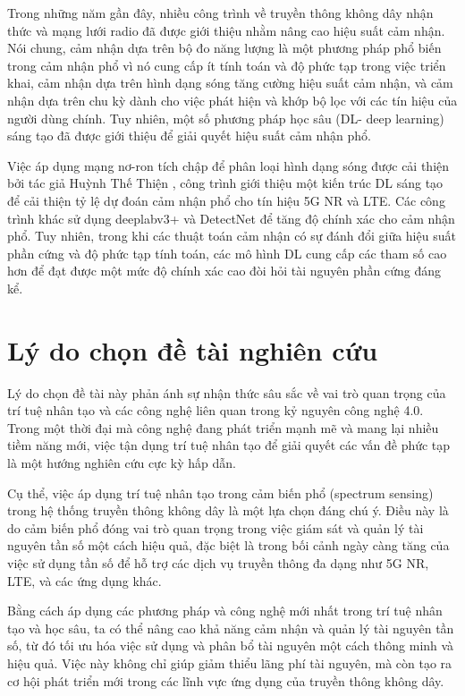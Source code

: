 Trong những năm gần đây, nhiều công trình về truyền thông không dây nhận thức và mạng lưới radio đã được giới thiệu nhằm nâng cao hiệu suất cảm nhận. Nói chung, cảm nhận dựa trên bộ đo năng lượng là một phương pháp phổ biến trong cảm nhận phổ vì nó cung cấp ít tính toán và độ phức tạp trong việc triển khai, cảm nhận dựa trên hình dạng sóng tăng cường hiệu suất cảm nhận, và cảm nhận dựa trên chu kỳ dành cho việc phát hiện và khớp bộ lọc với các tín hiệu của người dùng chính. Tuy nhiên, một số phương pháp học sâu (DL- deep learning) sáng tạo đã được giới thiệu để giải quyết hiệu suất cảm nhận phổ.



Việc áp dụng mạng nơ-ron tích chập để phân loại hình dạng sóng được cải thiện bởi tác giả Huỳnh Thế Thiện \cite{huynh2024improved}, công trình \cite{huynhthe2023intelligence} giới thiệu một kiến trúc DL sáng tạo để cải thiện tỷ lệ dự đoán cảm nhận phổ cho tín hiệu 5G NR và LTE. Các công trình khác sử dụng deeplabv3+ \cite{nguyen2023accurate} và DetectNet \cite{gao2019deep} để tăng độ chính xác cho cảm nhận phổ. Tuy nhiên, trong khi các thuật toán cảm nhận có sự đánh đổi giữa hiệu suất phần cứng và độ phức tạp tính toán, các mô hình DL cung cấp các tham số cao hơn để đạt được một mức độ chính xác cao đòi hỏi tài nguyên phần cứng đáng kể.



\section{Lý do chọn đề tài nghiên cứu}
Lý do chọn đề tài này phản ánh sự nhận thức sâu sắc về vai trò quan trọng của trí tuệ nhân tạo và các công nghệ liên quan trong kỷ nguyên công nghệ 4.0. Trong một thời đại mà công nghệ đang phát triển mạnh mẽ và mang lại nhiều tiềm năng mới, việc tận dụng trí tuệ nhân tạo để giải quyết các vấn đề phức tạp là một hướng nghiên cứu cực kỳ hấp dẫn.

Cụ thể, việc áp dụng trí tuệ nhân tạo trong cảm biến phổ (spectrum sensing) trong hệ thống truyền thông không dây là một lựa chọn đáng chú ý. Điều này là do cảm biến phổ đóng vai trò quan trọng trong việc giám sát và quản lý tài nguyên tần số một cách hiệu quả, đặc biệt là trong bối cảnh ngày càng tăng của việc sử dụng tần số để hỗ trợ các dịch vụ truyền thông đa dạng như 5G NR, LTE, và các ứng dụng khác.

Bằng cách áp dụng các phương pháp và công nghệ mới nhất trong trí tuệ nhân tạo và học sâu, ta có thể nâng cao khả năng cảm nhận và quản lý tài nguyên tần số, từ đó tối ưu hóa việc sử dụng và phân bổ tài nguyên một cách thông minh và hiệu quả. Việc này không chỉ giúp giảm thiểu lãng phí tài nguyên, mà còn tạo ra cơ hội phát triển mới trong các lĩnh vực ứng dụng của truyền thông không dây.

